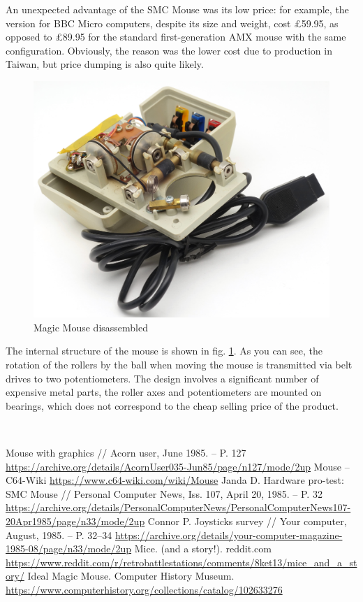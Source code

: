 \documentclass[11pt, a4paper]{article}
\begin{document}
An unexpected advantage of the SMC Mouse was its low price: for example, the version for BBC Micro computers, despite its size and weight, cost \pounds 59.95, as opposed to \pounds 89.95 for the standard first-generation AMX mouse with the same configuration. Obviously, the reason was the lower cost due to production in Taiwan, but price dumping is also quite likely.

 \begin{figure}[h]
    \centering
    \includegraphics[scale=0.65]{1985_smc_contriver_magic_mouse/inside_30.jpg}
    \caption{Magic Mouse disassembled}
    \label{fig:MagicMouseInside}
\end{figure}


The internal structure of the mouse is shown in fig. \ref{fig:MagicMouseInside}. As you can see, the rotation of the rollers by the ball when moving the mouse is transmitted via belt drives to two potentiometers. The design involves a significant number of expensive metal parts, the roller axes and potentiometers are mounted on bearings, which does not correspond to the cheap selling price of the product.

~

\begin{thebibliography}{9}
 Mouse with graphics // Acorn user, June 1985. -- P. 127 \url{https://archive.org/details/AcornUser035-Jun85/page/n127/mode/2up}
 Mouse -- C64-Wiki \url{https://www.c64-wiki.com/wiki/Mouse}
 Janda D. Hardware pro-test: SMC Mouse // Personal Computer News, Iss. 107, April 20, 1985. -- P. 32 \url{https://archive.org/details/PersonalComputerNews/PersonalComputerNews107-20Apr1985/page/n33/mode/2up}
 Connor P. Joysticks survey // Your computer, August, 1985. -- P. 32--34 \url{https://archive.org/details/your-computer-magazine-1985-08/page/n33/mode/2up}
 Mice. (and a story!). reddit.com
 \url{https://www.reddit.com/r/retrobattlestations/comments/8ket13/mice_and_a_story/}
 Ideal Magic Mouse. Computer History Museum. \url{https://www.computerhistory.org/collections/catalog/102633276}
\end{thebibliography}
\end{document}
